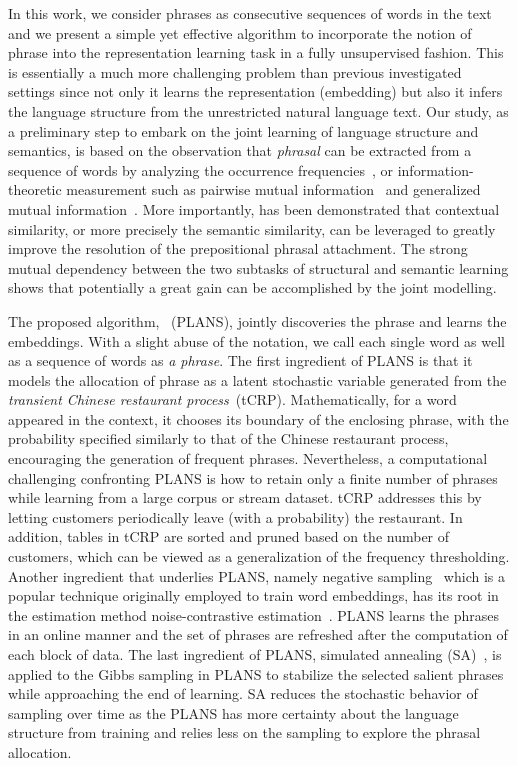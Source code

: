 In this work, we consider phrases as consecutive sequences of words in the text
and we present a simple yet effective algorithm to incorporate the notion of
phrase into the representation learning task in a fully unsupervised fashion.
This is essentially a much more challenging problem than previous investigated
settings since not only it learns the representation (embedding) but also it
infers the language structure from the unrestricted natural language text. Our
study, as a preliminary step to embark on the joint learning of language
structure and semantics, is based on the observation that \emph{phrasal} can be
extracted from a sequence of words by analyzing the occurrence
frequencies~\cite{witten1999kea,lindsey2012phrase,wang2007topical}, or
information-theoretic measurement such as pairwise mutual
information~\cite{fano1961transmission,church1990word} and generalized mutual
information~\cite{magerman1990parsing}. More importantly,
\cite{pantel2000unsupervised,collins1995prepositional}has been demonstrated that
contextual similarity, or more precisely the semantic similarity, can be
leveraged to greatly improve the resolution of the prepositional phrasal
attachment. The strong mutual dependency between the two subtasks of structural
and semantic learning shows that potentially a great gain can be accomplished by
the joint modelling.

The proposed algorithm, \PLANS~(PLANS), jointly discoveries the phrase and
learns the embeddings. With a slight abuse of the notation, we call each single
word as well as a sequence of words as \emph{a phrase}. The first ingredient of
PLANS is that it models the allocation of phrase as a latent stochastic
variable generated from the \emph{transient Chinese restaurant process}~(tCRP).
Mathematically, for a word appeared in the context, it chooses its boundary of
the enclosing phrase, with the probability specified similarly to that of the
Chinese restaurant process, encouraging the generation of frequent phrases.
Nevertheless, a computational challenging confronting PLANS is how to retain
only a finite number of phrases while learning from a large corpus or stream
dataset.  tCRP addresses this by letting customers periodically leave (with a
probability) the restaurant. In addition, tables in tCRP are sorted and pruned
based on the number of customers, which can be viewed as a generalization of the
frequency thresholding. Another ingredient that underlies PLANS, namely negative
sampling~\cite{mikolov2013efficient} which is a popular technique originally
employed to train word embeddings, has its root in the estimation method
noise-contrastive estimation~\cite{gutmann2010noise}.  PLANS learns the phrases
in an online manner and the set of phrases are refreshed after the computation
of each block of data. The last ingredient of PLANS, simulated annealing
(SA)~\cite{aarts1988simulated,brooks1995optimization}, is applied to the Gibbs
sampling in PLANS to stabilize the selected salient phrases while approaching
the end of learning. SA reduces the stochastic behavior of sampling over time as
the PLANS has more certainty about the language structure from training and
relies less on the sampling to explore the phrasal allocation.
